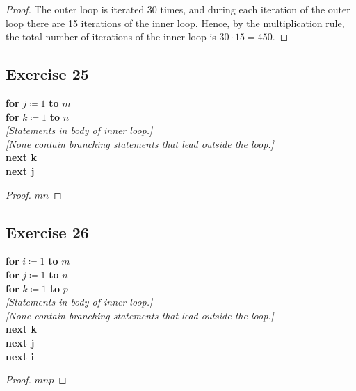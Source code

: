 \documentclass[14pt]{extarticle}
\begin{document}
\begin{proof}
     The outer loop is iterated 30 times, and during each iteration of the outer loop there are 15 iterations of the
     inner loop. Hence, by the multiplication rule, the total number of iterations of the inner loop is
     \(30 \cdot 15 = 450\).
\end{proof}

\subsection{Exercise 25}
\begin{tabbing}
     {\bf for} \= \(j \coloneqq 1\) {\bf to} $m$ \\
     \> {\bf for} \= \(k \coloneqq 1\) {\bf to} $n$ \\
     \>           \> {\it [Statements in body of inner loop.]} \\
     \>           \> {\it [None contain branching statements that lead outside the loop.]} \\
     \> {\bf next k} \\
     {\bf next j}
\end{tabbing}

\begin{proof}
     \(mn\)
\end{proof}

\subsection{Exercise 26}
\begin{tabbing}
     {\bf for} \= \(i \coloneqq 1\) {\bf to} $m$ \\
     \> {\bf for} \= \(j \coloneqq 1\) {\bf to} $n$ \\
     \>           \> {\bf for} \= \(k \coloneqq 1\) {\bf to} $p$ \\
     \>           \>           \> {\it [Statements in body of inner loop.]} \\
     \>           \>           \> {\it [None contain branching statements that lead outside the loop.]} \\
     \>           \> {\bf next k} \\
     \> {\bf next j} \\
     {\bf next i}
\end{tabbing}

\begin{proof}
     \(mnp\)
\end{proof}
\end{document}
